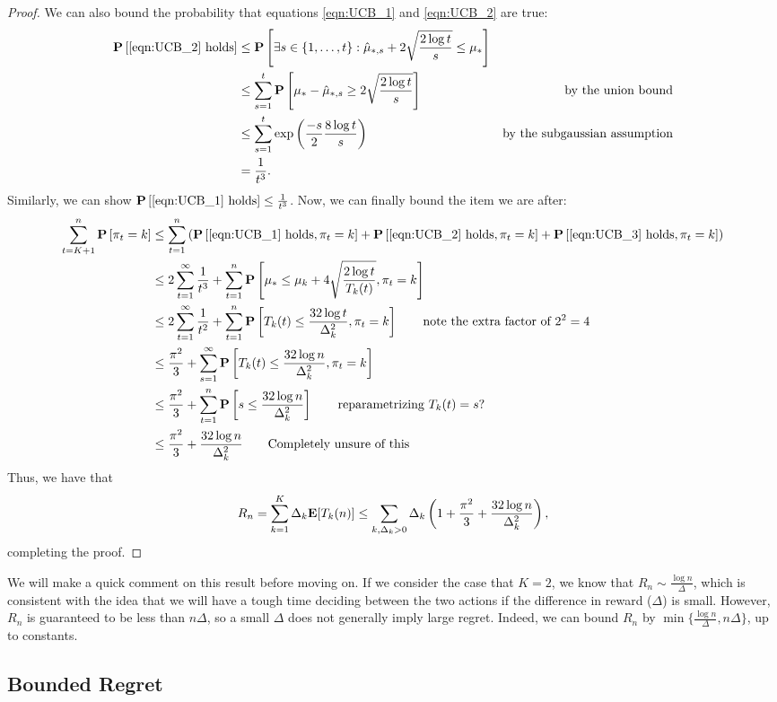 \begin{proof}
We can also bound the probability that equations \eqref{eqn:UCB_1} and \eqref{eqn:UCB_2} are true:
\begin{align*}
\mathbf{P} \left[\text{\eqref{eqn:UCB_2} holds} \right] & \leq \mathbf{P} \left[ \exists s \in \{1, \ldots, t\}: \hat \mu_{*, s} + 2 \sqrt{\frac{2 \log t}{s}} \leq \mu_* \right] \\
&\leq \sum_{s = 1}^t \mathbf{P} \left[ \mu_* - \hat \mu_{*, s} \geq 2 \sqrt{\frac{2 \log t}{s}}\right] \qquad &\text{by the union bound}\\
&\leq \sum_{s=1}^t \exp \left(\frac{-s}{2} \frac{8 \log t}{s}\right) \qquad &\text{by the subgaussian assumption} \\
&= \frac{1}{t^3}.
\end{align*}
Similarly, we can show $\mathbf{P} \left[ \text{\eqref{eqn:UCB_1} holds}\right] \leq \frac{1}{t^3}$.  
\allowdisplaybreaks
Now, we can finally bound the item we are after: 
\begin{align*}
\sum_{t=K+1}^n \mathbf{P} \left[\pi_t = k \right] & \leq \sum_{t=1}^n \left(\mathbf{P} \left[ \text{\eqref{eqn:UCB_1} holds}, \pi_t = k\right] + \mathbf{P}\left[ \text{\eqref{eqn:UCB_2} holds}, \pi_t = k\right] + \mathbf{P}\left[\text{\eqref{eqn:UCB_3} holds}, \pi_t = k\right] \right) \\
&\leq 2 \sum_{t=1}^\infty \frac{1}{t^3} + \sum_{t=1}^n \mathbf{P} \left[\mu_* \leq \mu_k + 4 \sqrt{\frac{2 \log t}{T_k(t)}}, \pi_t = k \right] \\
&\leq 2 \sum_{t=1}^\infty \frac{1}{t^2} + \sum_{t=1}^n \mathbf{P}\left[T_k(t) \leq \frac{32 \log t}{\Delta_k^2}, \pi_t = k \right]
\qquad \text{note the extra factor of $2^2 = 4$} \\
& \leq \frac{\pi^2}{3} + \sum_{s=1}^\infty \mathbf{P}\left[T_k(t) \leq \frac{32 \log n}{\Delta_k^2}, \pi_t = k \right] \\
&\leq \frac{\pi^2}{3} + \sum_{t=1}^n \mathbf{P}\left[s \leq \frac{32 \log n}{\Delta_k^2}\right] \qquad \text{reparametrizing $T_k(t) = s$?} \\
&\leq \frac{\pi^2}{3} + \frac{32 \log n}{\Delta_k^2} \qquad \text{Completely unsure of this}
\end{align*}
\allowdisplaybreaks[0]
Thus, we have that 
\[
R_n = \sum_{k=1}^K \Delta_k \mathbf{E} [T_k(n)] \leq \sum_{k, \Delta_k > 0} \Delta_k \left(1 + \frac{\pi^2}{3} + \frac{32 \log n}{\Delta_k^2} \right),
\]
completing the proof. 
\end{proof}

We will make a quick comment on this result before moving on. If we consider the case that $K = 2$, we know that $R_n \sim \frac{\log n}{\Delta}$, which is consistent with the idea that we will have a tough time deciding between the two actions if the difference in reward ($\Delta$) is small. However, $R_n$ is guaranteed to be less than $n \Delta$, so a small $\Delta$ does not generally imply large regret. Indeed, we can bound $R_n$ by $\min \{\frac{\log n}{\Delta}, n\Delta\}$, up to constants. 
\subsection{Bounded Regret}